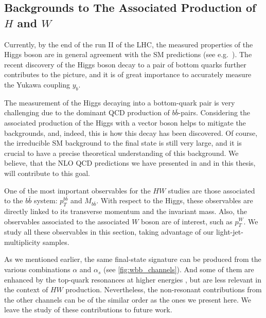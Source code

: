 

\subsection{Backgrounds to The Associated Production of \texorpdfstring{$H$}{H} and \texorpdfstring{$W$}{W}}
\label{sec:hw}

Currently, by the end of the run II of the LHC,
the measured properties of the Higgs boson are
in general agreement with the SM predictions (see e.g.\ \cite{Khachatryan:2016vau}).
The recent discovery of the Higgs boson decay to a pair of bottom quarks \cite{Sirunyan:2018kst,Aaboud:2018zhk}
further contributes to the picture, 
and it is of great importance to accurately measure the Yukawa coupling $y_b$.

The measurement of the Higgs decaying into a bottom-quark pair
is very challenging due to the dominant QCD production of $b\bar{b}$-pairs.
Considering the associated production of the Higgs with a vector boson 
helps to mitigate the backgrounds, and, indeed, this is how this decay has been discovered.
Of course, the irreducible SM background to the \Wbb{} final state is still very large,
and it is crucial to have a precise theoretical understanding of this background. 
We believe, that the NLO QCD predictions we have presented in \cite{Anger:2017glm} and
in this thesis, will contribute to this goal.

One of the most important observables for the $HW$ studies are those associated to the $b\bar
b$ system: $p_T^{b\bar b}$ and $M_{b\bar b}$.
With respect to the Higgs, these observables are directly linked to its transverse momentum and the invariant mass. 
Also, the observables associated to the associated $W$ boson are of interest, such as $p_T^W$.
We study all these observables in this section, taking advantage of our light-jet-multiplicity samples.

As we mentioned earlier, the same final-state signature can
be produced from the various combinations $\alpha$ and $\alpha_s$ (see \cref{fig:wbb_channels}). 
And some of them are enhanced by the top-quark resonances at higher energies \cite{Denner:2017kzu},
but are less relevant in the context of $HW$ production.
Nevertheless, the non-resonant contributions from the other channels can be of the similar order
as the ones we present here. We leave the study of these contributions to future work.

